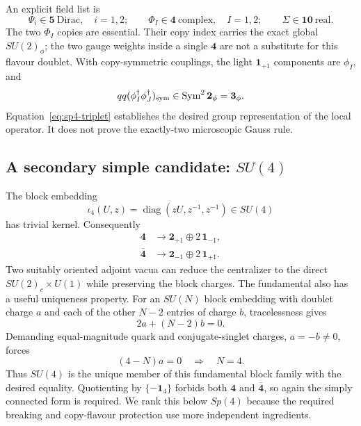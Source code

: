 \documentclass[11pt]{article}
\theoremstyle{definition}
\theoremstyle{remark}
\begin{document}
An explicit field list is
\begin{equation}
 \Psi_i\in\bm5\ \text{Dirac},\quad i=1,2;
 \qquad
 \Phi_I\in\bm4\ \text{complex},\quad I=1,2;
 \qquad
 \Sigma\in\bm{10}\ \text{real}.
 \label{eq:sp4-field-list}
\end{equation}
The two \(\Phi_I\) copies are essential.  Their copy index carries the exact
global \(SU(2)_\phi\); the two gauge weights inside a single \(\bm4\) are not
a substitute for this flavour doublet.  With copy-symmetric couplings, the
light \(\bm1_{+1}\) components are \(\phi_I\), and
\begin{equation}
 qq(\phi_I^\dagger\phi_J^\dagger)_{\rm sym}
 \in\operatorname{Sym}^2\bm2_\phi=\bm3_\phi.
 \label{eq:sp4-triplet}
\end{equation}
Equation~\eqref{eq:sp4-triplet} establishes the desired group representation
of the local operator.  It does not prove the exactly-two microscopic Gauss
rule.

\subsection{A secondary simple candidate: \texorpdfstring{\(SU(4)\)}{SU(4)}}

The block embedding
\begin{equation}
 \iota_4(U,z)=\operatorname{diag}(zU,z^{-1},z^{-1})
 \in SU(4)
 \label{eq:su4-embedding}
\end{equation}
has trivial kernel.  Consequently
\begin{align}
 \bm4&\to\bm2_{+1}\oplus2\,\bm1_{-1},
 \label{eq:su4-4}\\
 \overline{\bm4}&\to\bm2_{-1}\oplus2\,\bm1_{+1}.
 \label{eq:su4-bar4}
\end{align}
Two suitably oriented adjoint vacua can reduce the centralizer to the direct
\(SU(2)_c\times U(1)\) while preserving the block charges.  The fundamental
also has a useful uniqueness property.  For an \(SU(N)\) block embedding
with doublet charge \(a\) and each of the other \(N-2\) entries of charge
\(b\), tracelessness gives
\begin{equation}
 2a+(N-2)b=0.
 \label{eq:sun-traceless}
\end{equation}
Demanding equal-magnitude quark and conjugate-singlet charges, \(a=-b\ne0\),
forces
\begin{equation}
 (4-N)a=0\quad\Longrightarrow\quad N=4.
 \label{eq:su4-unique}
\end{equation}
Thus \(SU(4)\) is the unique member of this fundamental block family with
the desired equality.  Quotienting by \(\{-\bm1_4\}\) forbids both
\(\bm4\) and \(\overline{\bm4}\), so again the simply connected form is
required.  We rank this below \(Sp(4)\) because the required breaking and
copy-flavour protection use more independent ingredients.
\end{document}
